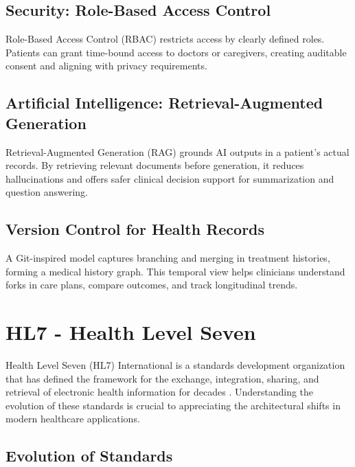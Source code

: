 \subsection{Security: Role-Based Access Control}
Role-Based Access Control (RBAC) restricts access by clearly defined roles.
Patients can grant time-bound access to doctors or caregivers, creating
auditable consent and aligning with privacy requirements.

\subsection{Artificial Intelligence: Retrieval-Augmented Generation}
Retrieval-Augmented Generation (RAG) grounds AI outputs in a patient's actual
records. By retrieving relevant documents before generation, it reduces
hallucinations and offers safer clinical decision support for summarization and
question answering.

\subsection{Version Control for Health Records}
A Git-inspired model captures branching and merging in treatment histories,
forming a medical history graph. This temporal view helps clinicians understand
forks in care plans, compare outcomes, and track longitudinal trends.

\section{HL7 - Health Level Seven}

Health Level Seven (HL7) International is a standards development organization
that has defined the framework for the exchange, integration, sharing, and
retrieval of electronic health information for decades \cite{intellisoft}.
Understanding the evolution of these standards is crucial to appreciating the
architectural shifts in modern healthcare applications.

\subsection{Evolution of Standards}

